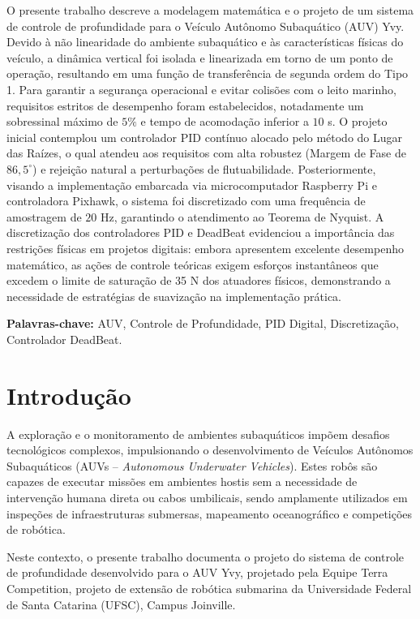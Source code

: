 \documentclass[12pt, a4paper]{article}
\begin{document}
	O presente trabalho descreve a modelagem matemática e o projeto de um sistema de controle de profundidade para o Veículo Autônomo Subaquático (AUV) Yvy. Devido à não linearidade do ambiente subaquático e às características físicas do veículo, a dinâmica vertical foi isolada e linearizada em torno de um ponto de operação, resultando em uma função de transferência de segunda ordem do Tipo 1. Para garantir a segurança operacional e evitar colisões com o leito marinho, requisitos estritos de desempenho foram estabelecidos, notadamente um sobressinal máximo de $5\%$ e tempo de acomodação inferior a $10$ s. O projeto inicial contemplou um controlador PID contínuo alocado pelo método do Lugar das Raízes, o qual atendeu aos requisitos com alta robustez (Margem de Fase de $86{,}5^\circ$) e rejeição natural a perturbações de flutuabilidade. Posteriormente, visando a implementação embarcada via microcomputador Raspberry Pi e controladora Pixhawk, o sistema foi discretizado com uma frequência de amostragem de $20$ Hz, garantindo o atendimento ao Teorema de Nyquist. A discretização dos controladores PID e DeadBeat evidenciou a importância das restrições físicas em projetos digitais: embora apresentem excelente desempenho matemático, as ações de controle teóricas exigem esforços instantâneos que excedem o limite de saturação de 35 N dos atuadores físicos, demonstrando a necessidade de estratégias de suavização na implementação prática.

	\vspace{1em}
	\noindent\textbf{Palavras-chave:} AUV, Controle de Profundidade, PID Digital, Discretização, Controlador DeadBeat.
	\clearpage

	\renewcommand{\contentsname}{\centerline{SUMÁRIO}}
	\tableofcontents
	\clearpage

	\section{Introdução}

		A exploração e o monitoramento de ambientes subaquáticos impõem desafios tecnológicos complexos, impulsionando o desenvolvimento de Veículos Autônomos Subaquáticos (AUVs -- \textit{Autonomous Underwater Vehicles}). Estes robôs são capazes de executar missões em ambientes hostis sem a necessidade de intervenção humana direta ou cabos umbilicais, sendo amplamente utilizados em inspeções de infraestruturas submersas, mapeamento oceanográfico e competições de robótica. 

		Neste contexto, o presente trabalho documenta o projeto do sistema de controle de profundidade desenvolvido para o AUV Yvy, projetado pela Equipe Terra Competition, projeto de extensão de robótica submarina da Universidade Federal de Santa Catarina (UFSC), Campus Joinville. 
\end{document}
